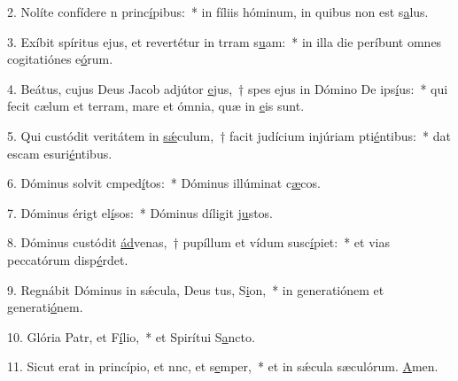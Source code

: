 2. Nolíte confídere n princ\uline{í}pibus:~* in fíliis hóminum, in quibus non est s\uline{a}lus.\par 
3. Exíbit spíritus ejus, et revertétur in trram s\uline{u}am:~* in illa die períbunt omnes cogitatiónes e\uline{ó}rum.\par 
4. Beátus, cujus Deus Jacob adjútor \uline{e}jus,~† spes ejus in Dómino De ips\uline{í}us:~* qui fecit cælum et terram, mare et ómnia, quæ in \uline{e}is sunt.\par 
5. Qui custódit veritátem in \uline{sǽ}culum,~† facit judícium injúriam pti\uline{é}ntibus:~* dat escam esuri\uline{é}ntibus.\par 
6. Dóminus solvit cmped\uline{í}tos:~* Dóminus illúminat c\uline{æ}cos.\par 
7. Dóminus érigt el\uline{í}sos:~* Dóminus díligit j\uline{u}stos.\par 
8. Dóminus custódit \uline{ád}venas,~† pupíllum et vídum susc\uline{í}piet:~* et vias peccatórum disp\uline{é}rdet.\par 
9. Regnábit Dóminus in sǽcula, Deus tus, S\uline{i}on,~* in generatiónem et generati\uline{ó}nem.\par 
10. Glória Patr, et F\uline{í}lio,~* et Spirítui S\uline{a}ncto.\par 
11. Sicut erat in princípio, et nnc, et s\uline{e}mper,~* et in sǽcula sæculórum. \uline{A}men.\par 
